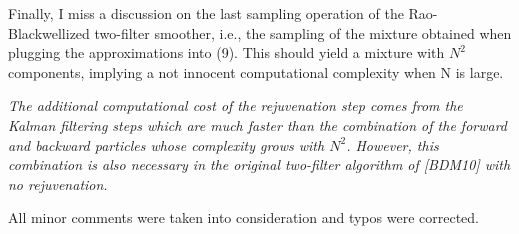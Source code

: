 \vspace{.5cm}

\noindent Finally, I miss a discussion on the last sampling operation of the Rao-Blackwellized
two-filter smoother, i.e., the sampling of the mixture obtained when plugging the approximations into (9). This should yield a mixture with $N^2$ components, implying a not innocent computational complexity when N is large.

\vspace{.2cm}
{\em
\noindent The additional computational cost of the rejuvenation step comes from the Kalman filtering steps which are much faster than the combination of the forward and backward particles whose complexity grows with $N^2$. However, this combination is also necessary in the original two-filter algorithm of [BDM10] with no rejuvenation.
}

\vspace{.5cm}

\noindent All minor comments were taken into consideration and typos were corrected.
